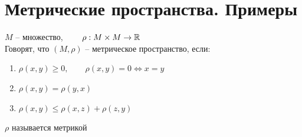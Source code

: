 \section{Метрические пространства. Примеры}

\begin{definition}
	$ M $ -- множество, $ \qquad \rho : M \times M \to \mathbb{R} $ \\
	Говорят, что $ (M, \rho) $ -- метрическое пространство, если:
	\begin{enumerate}
		\item $ \rho(x, y) \ge 0, \qquad \rho(x, y) = 0 \iff x = y $
		\item $ \rho(x, y) = \rho(y, x) $
		\item $ \rho(x, y) \le \rho(x, z) + \rho(z, y) $
	\end{enumerate}
	$ \rho $ называется метрикой
\end{definition}

